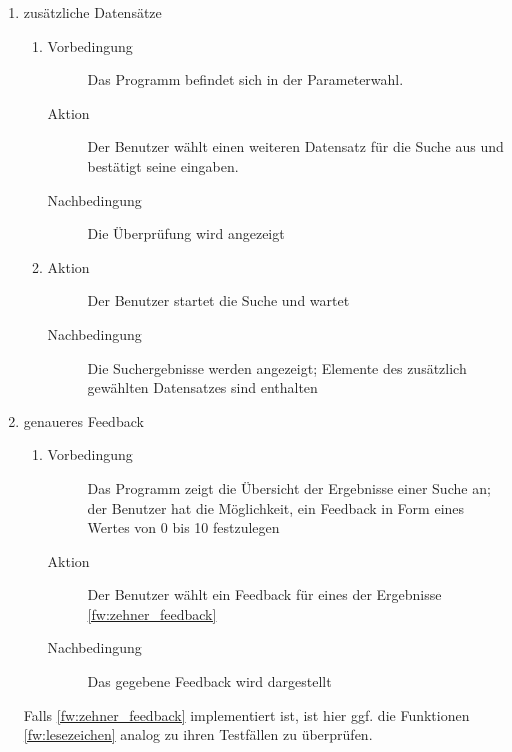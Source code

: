 \begin{enumerate} [label=\bfseries /TSW \arabic*0/, leftmargin=*]
	\item zusätzliche Datensätze \label{ts:mehrere_datensaetze_waehlen}
	\begin{enumerate}[leftmargin=0pt]
		\item
		\begin{description}
			\item[Vorbedingung] Das Programm befindet sich in der Parameterwahl.
			\item[Aktion] Der Benutzer wählt einen weiteren Datensatz für die Suche aus und bestätigt seine eingaben.
			\item[Nachbedingung] Die Überprüfung wird angezeigt
		\end{description}
		\item
		\begin{description}
			\item[Aktion] Der Benutzer startet die Suche und wartet
			\item[Nachbedingung] Die Suchergebnisse werden angezeigt; Elemente des zusätzlich gewählten Datensatzes sind enthalten
		\end{description}
	\end{enumerate}

	\item genaueres \gls{Feedback} \label{ts:zehner_feedback}
	\begin{enumerate}[leftmargin=0pt]
		\item
		\begin{description}
			\item[Vorbedingung] Das Programm zeigt die Übersicht der Ergebnisse einer Suche an; der Benutzer hat die Möglichkeit, ein \gls{Feedback} in Form eines Wertes von 0 bis 10 festzulegen
			\item[Aktion] Der Benutzer wählt ein \gls{Feedback} für eines der Ergebnisse \ref{fw:zehner_feedback}
			\item[Nachbedingung] Das gegebene \gls{Feedback} wird dargestellt
		\end{description}
	\end{enumerate}
	Falls \ref{fw:zehner_feedback} implementiert ist, ist hier ggf. die Funktionen \ref{fw:lesezeichen} analog zu ihren Testfällen zu überprüfen.
\end{enumerate}

